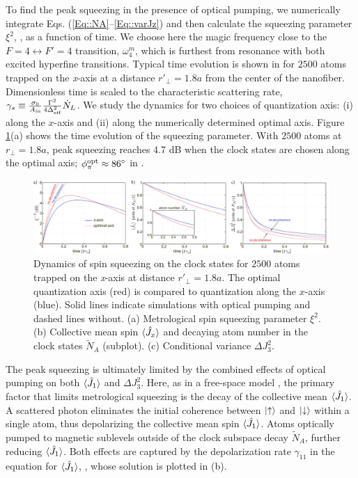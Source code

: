 \documentclass[preprint, aps,pra,onecolumn]{revtex4-1} %
\newcommand{\varz}{\Delta J_3^2}
\newcommand{\jx}{\hat{J}_1}
\newcommand{\qangle}{\phi_\pi}
\newcommand{\magic}[1]{\omega_{#1}^m}
\newcommand{\NA}{\tilde{N}_A}
\begin{document}
To find the peak squeezing in the presence of optical pumping, we numerically integrate Eqs. (\ref{Eq::NA}--\ref{Eq::varJz}) and then calculate the squeezing parameter $\xi^2$, , as a function of time. 
We choose here the magic frequency close to the $ F=4\leftrightarrow F'=4 $ transition, $ \magic{4} $, which is furthest from resonance with both excited hyperfine transitions. 
Typical time evolution is shown in  for $2500$ atoms trapped on the \emph{x}-axis at a distance $r'\!_\perp=1.8a$ from the center of the nanofiber. 
Dimensionless time is scaled to the characteristic scattering rate, $\gamma_s \equiv %
\frac{\sigma_0}{A_{\rm in}}\frac{\Gamma^2}{4 \Delta_\eff^2} \dot{N}_L$. 
We study the dynamics for two choices of quantization axis: (i) along the $x$-axis and (ii) along the numerically determined optimal axis. 
Figure \ref{Fig::Squeezing_Dynamics}(a) shows the time evolution of the squeezing parameter. 
With $2500$ atoms at $r_\perp = 1.8a$, peak squeezing reaches 4.7 dB when the clock states are chosen along the optimal axis; $\qangle^{\rm opt} \approx 86^\circ$ in . 

\begin{figure}[t]
\includegraphics[scale=0.42]{./Figs/Fig_SqueezingDynamics}
\caption{Dynamics of spin squeezing on the clock states for $2500$ atoms trapped on the \emph{x}-axis at distance $ r'\!_\perp=1.8a$. 
The optimal quantization axis (red) is compared to quantization along the $x$-axis (blue). 
Solid lines indicate simulations with optical pumping and dashed lines without. 
(a) Metrological spin squeezing parameter $\xi^{2}$. 
(b) Collective mean spin $\langle{\hat{J}_x}\rangle$ and decaying atom number in the clock states $\NA$ (subplot).
(c) Conditional variance $\varz$. 
}\label{Fig::Squeezing_Dynamics}
\end{figure}

The peak squeezing is ultimately limited by the combined effects of optical pumping on both $\expt{\jx}$ and $\varz$.  Here, as in a free-space model \cite{baragiola_three-dimensional_2014}, the primary factor that limits metrological squeezing is the decay of the collective mean $\expt{\jx}$. 
A scattered photon eliminates the initial coherence between $\lvert{\uparrow}\rangle$ and $\lvert{\downarrow}\rangle$ within a single atom, thus depolarizing the collective mean spin $\expt{\jx}$.  
Atoms optically pumped to magnetic sublevels outside of the clock subspace decay $\NA$, further reducing $\expt{\jx}$. 
Both effects are captured by the depolarization rate $\gamma_{11}$ in the equation for $\expt{\jx}$, , whose solution is plotted in (b).
\end{document}
